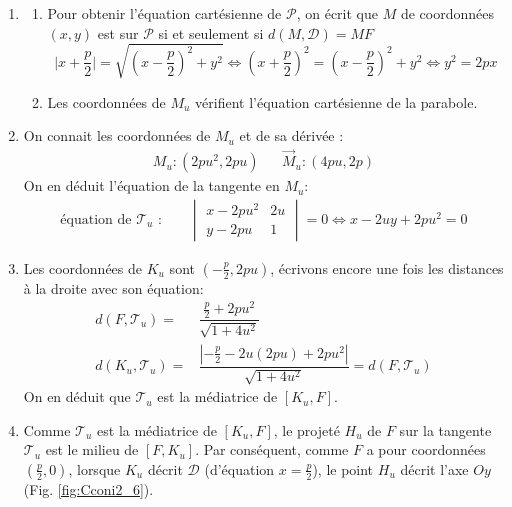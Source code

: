 \begin{enumerate}
\item\begin{enumerate}
 \item Pour obtenir l'équation cartésienne de $\mathcal P$, on écrit que $M$ de coordonnées $(x,y)$ est sur $\mathcal P$ si et seulement si $d(M,\mathcal D)=MF$
\begin{displaymath}
 \vert x+\dfrac{p}{2}\vert=\sqrt{(x-\dfrac{p}{2})^2+y^2}
\Leftrightarrow
(x+\dfrac{p}{2})^2=(x-\dfrac{p}{2})^2+y^2
\Leftrightarrow
y^2=2px
\end{displaymath}
 \item Les coordonnées de $M_u$ vérifient l'équation cartésienne de la parabole.
\end{enumerate}
 
\item On connait les coordonnées de $M_u$ et de sa dérivée :
\begin{align*}
 M_u:(2pu^2,2pu) & & \overrightarrow M_u :(4pu,2p)
\end{align*}
On en déduit l'équation de la tangente en $M_u$:
\begin{align*}
\text{équation de $\mathcal T_u$ : }& &
 \begin{vmatrix}
  x-2pu^2 & 2u \\
y-2pu & 1
 \end{vmatrix}=0
\Leftrightarrow
x-2uy+2pu^2=0
\end{align*}

\item Les coordonnées de $K_u$ sont $(-\frac{p}{2},2pu)$, écrivons encore une fois les distances à la droite avec son équation:
\begin{align*}
 d(F,\mathcal T_u)=&\dfrac{\frac{p}{2}+2pu^2}{\sqrt{1+4u^2}}\\
d(K_u,\mathcal T_u)=&\dfrac{\left\vert -\frac{p}{2}-2u(2pu)+2pu^2 \right\vert}{\sqrt{1+4u^2}}
= d(F,\mathcal T_u)
\end{align*}
On en déduit que $\mathcal T_u$ est la médiatrice de $[K_u,F]$.
\item Comme $\mathcal T_u$ est la médiatrice de $[K_u,F]$, le projeté $H_u$ de $F$ sur la tangente $\mathcal T_u$ est le milieu de $[F,K_u]$. Par conséquent, comme $F$ a pour coordonnées $(\frac{p}{2},0)$, lorsque $K_u$ décrit $\mathcal D$ (d'équation $x=\frac{p}{2}$), le point $H_u$ décrit l'axe $Oy$ (Fig. \ref{fig:Cconi2_6}).
\end{enumerate}

\clearpage